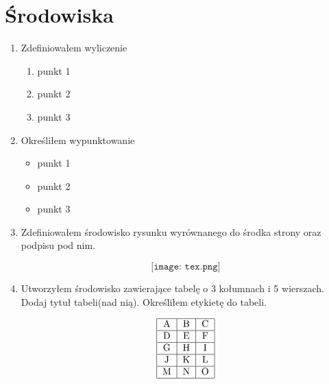 \documentclass[10pt]{article}
\begin{document}
\section{Środowiska}
\begin{enumerate}[resume]
\item Zdefiniowałem wyliczenie
\begin{enumerate}
\item punkt 1
\item punkt 2
\item punkt 3
\end{enumerate}
\item Określiłem wypunktowanie
\begin{itemize}
\item punkt 1
\item punkt 2
\item punkt 3
\end{itemize}
\item Zdefiniowałem środowisko rysunku wyrównanego do środka strony oraz podpisu pod nim.
\begin{center}
\begin{equation}
\texttt{[image: tex.png]}
\label{ris:da}
\end{equation}
\end{center}
\clearpage
\item Utworzyłem środowisko zawierające tabelę o 3 kołumnach i 5 wierszach. Dodaj tytuł tabeli(nad nią). Określiłem etykietę do tabeli.
\begin{table}[h]
\caption{\textit{Przykładowy tytuł tabeli}}
\label{tab:da}
\begin{center}
\begin{equation}
\begin{tabular}{|c|c|c|}
    \hline
    A & B & C \\
    \hline
    D & E & F \\
    \hline
    G & H & I \\
    \hline
    J & K & L \\
    \hline
    M & N & O \\
    \hline
\end{tabular}
\end{equation}
\end{center}
\end{table}
\end{enumerate}
\end{document}
